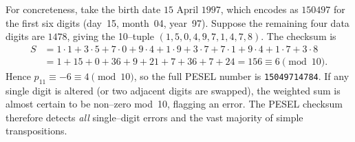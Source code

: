\documentclass[docmute]{article}
\begin{document}
\medskip

For concreteness, take the birth date $\text{15 April 1997}$, which encodes as $150497$ for the first six digits (day 15, month 04, year 97).  Suppose the remaining four data digits are $1478$, giving the 10--tuple $(1,5,0,4,9,7,1,4,7,8)$.  The checksum is
\[
\begin{aligned}
  S &=1\cdot1+3\cdot5+7\cdot0+9\cdot4+1\cdot9+3\cdot7+7\cdot1+9\cdot4+1\cdot7+3\cdot8\\
    &=1+15+0+36+9+21+7+36+7+24=156\equiv6\pmod{10}.
\end{aligned}
\]
Hence $p_{11}\equiv -6\equiv4\pmod{10}$, so the full PESEL number is \texttt{15049714784}.  If any single digit is altered (or two adjacent digits are swapped), the weighted sum is almost certain to be non--zero mod 10, flagging an error.  The PESEL checksum therefore detects \emph{all} single--digit errors and the vast majority of simple transpositions.
\end{document}
